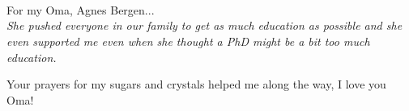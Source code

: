 \\ \\ \\
\begin{epigraph}
	\Large
	For my Oma, Agnes Bergen...\\
	\textit{She pushed everyone in our family to get as much education as possible and she even supported me even when she thought a PhD might be a bit too much education.} 

	Your prayers for my sugars and crystals helped me along the way, I love you Oma!
\end{epigraph}